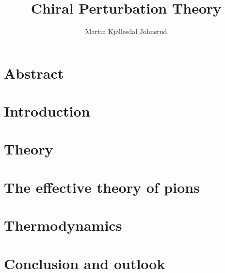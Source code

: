 \documentclass{book}
\title{Chiral Perturbation Theory}
\author{Martin Kjøllesdal Johnsrud}
\begin{document}
\maketitle 

\tableofcontents

\chapter*{Abstract}


\chapter{Introduction}



\chapter{Theory}
\label{chapter:theory}






\chapter{The effective theory of pions}
\label{chapter:effective theory of pions}









\chapter{Thermodynamics}
\label{chapter:thermodynamics}






\chapter{Conclusion and outlook}
\label{chpater:conclusion and outlook}
\end{document}
